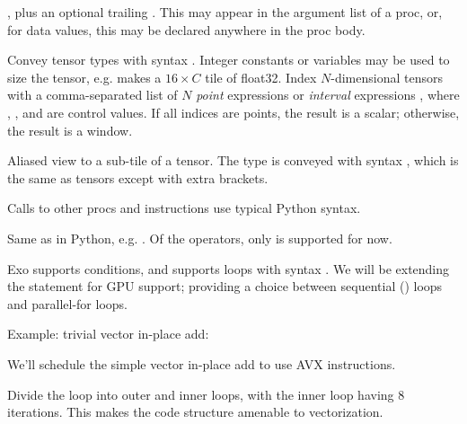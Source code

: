 \filbreak
{}

 , plus an optional trailing .
    This may appear in the argument list of a proc, or, for data values, this may be declared anywhere in the proc body.

\filbreak
{} Convey tensor types with syntax .
Integer constants or  variables may be used to size the tensor, e.g. {} makes  a $16 \times C$ tile of float32.
Index $N$-dimensional tensors with a comma-separated list of $N$ \textit{point} expressions  or \textit{interval} expressions , where , , and  are control values.
If all indices are points, the result is a scalar; otherwise, the result is a window.

\filbreak
{} Aliased view to a sub-tile of a tensor.
The type is conveyed with syntax , which is the same as tensors except with extra brackets.

\filbreak
{} Calls to other procs and instructions use typical Python syntax.

\filbreak
{} Same as in Python, e.g. .
Of the  operators, only \lighttt{+=} is supported for now.

\filbreak
{} Exo supports  conditions, and supports  loops with syntax .
We will be extending the  statement for GPU support; providing a choice between sequential () loops and parallel-for loops.

\filbreak
Example: trivial vector in-place add:



\filbreak
{}

We'll schedule the simple vector in-place add to use AVX instructions.

\filbreak
{}

Divide the  loop into outer  and inner  loops, with the inner loop having 8 iterations.
This makes the code structure amenable to vectorization.



